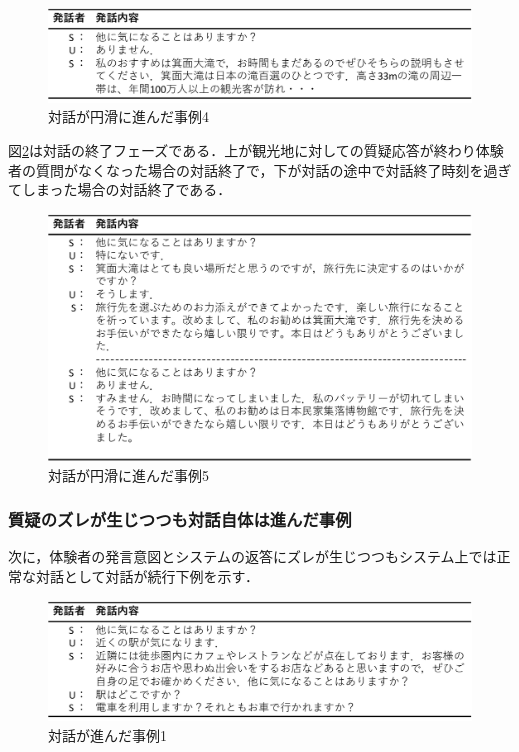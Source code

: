 \begin{figure}[th]
    \centering
    \includegraphics[scale=0.5]{pic/example04.pdf}
    \caption{対話が円滑に進んだ事例4}
    \label{対話が円滑に進んだ事例4}
\end{figure}
図\ref{対話が円滑に進んだ事例5}は対話の終了フェーズである．上が観光地に対しての質疑応答が終わり体験者の質問がなくなった場合の対話終了で，下が対話の途中で対話終了時刻を過ぎてしまった場合の対話終了である．
\begin{figure}[th]
    \centering
    \includegraphics[scale=0.5]{pic/example05.pdf}
    \caption{対話が円滑に進んだ事例5}
    \label{対話が円滑に進んだ事例5}
\end{figure}

\subsubsection*{質疑のズレが生じつつも対話自体は進んだ事例}
次に，体験者の発言意図とシステムの返答にズレが生じつつもシステム上では正常な対話として対話が続行下例を示す．

\begin{figure}[th]
    \centering
    \includegraphics[scale=0.5]{pic/example11.pdf}
    \caption{対話が進んだ事例1}
    \label{対話が進んだ事例1}
\end{figure}

